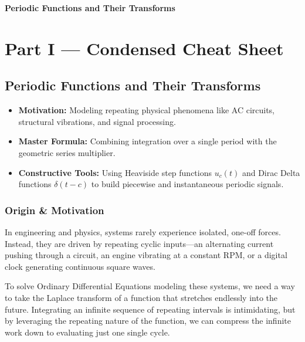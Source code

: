 \documentclass[11pt]{article}
\begin{document}
\begin{center}
    \Large\bfseries\color{headerblue} Periodic Functions and Their Transforms
\end{center}
\vspace{0.5cm}

\tableofcontents
\vspace{1cm}

{}
\section*{Part I --- Condensed Cheat Sheet}
\setcounter{section}{3}
\setcounter{subsection}{5}
\subsection{Periodic Functions and Their Transforms}

\begin{topicsbox}
\begin{itemize}[leftmargin=*]
    \item \textbf{Motivation:} Modeling repeating physical phenomena like AC circuits, structural vibrations, and signal processing.
    \item \textbf{Master Formula:} Combining integration over a single period with the geometric series multiplier.
    \item \textbf{Constructive Tools:} Using Heaviside step functions $u_c(t)$ and Dirac Delta functions $\delta(t-c)$ to build piecewise and instantaneous periodic signals.
\end{itemize}
\end{topicsbox}

\subsubsection*{Origin \& Motivation}
In engineering and physics, systems rarely experience isolated, one-off forces. Instead, they are driven by repeating cyclic inputs---an alternating current pushing through a circuit, an engine vibrating at a constant RPM, or a digital clock generating continuous square waves.

To solve Ordinary Differential Equations modeling these systems, we need a way to take the Laplace transform of a function that stretches endlessly into the future. Integrating an infinite sequence of repeating intervals is intimidating, but by leveraging the repeating nature of the function, we can compress the infinite work down to evaluating just one single cycle.
\end{document}
